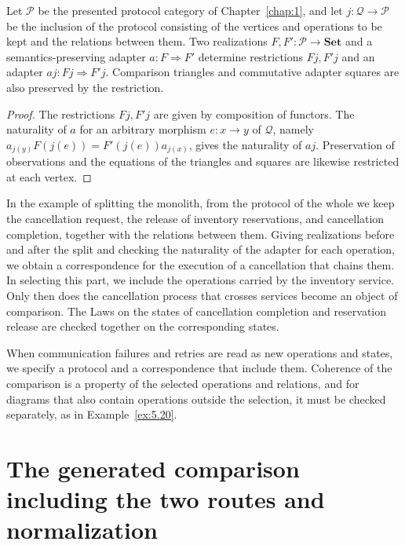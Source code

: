 \begin{proposition}\label{prop:5.36}

Let $\mathcal{P}$ be the presented protocol category of Chapter~\ref{chap:1}, and let
$j:\mathcal{Q}\to\mathcal{P}$ be the inclusion of the protocol consisting of the vertices
and operations to be kept and the relations between them. Two realizations
$F,F':\mathcal{P}\to{\mathbf{Set}}$ and a semantics-preserving adapter $a:F\Rightarrow F'$
determine restrictions $Fj,F'j$ and an adapter $aj:Fj\Rightarrow F'j$. Comparison triangles
and commutative adapter squares are also preserved by the restriction.

\end{proposition}

\begin{proof}

The restrictions $Fj,F'j$ are given by composition of functors. The naturality of $a$ for
an arbitrary morphism $e:x\to y$ of $\mathcal{Q}$, namely
$a_{j(y)}F(j(e))=F'(j(e))a_{j(x)}$, gives the naturality of $aj$. Preservation of
observations and the equations of the triangles and squares are likewise restricted at
each vertex.

\end{proof}

In the example of splitting the monolith, from the protocol of the whole we keep the
cancellation request, the release of inventory reservations, and cancellation completion,
together with the relations between them. Giving realizations before and after the split
and checking the naturality of the adapter for each operation, we obtain a correspondence
for the execution of a cancellation that chains them. In selecting this part, we include
the operations carried by the inventory service. Only then does the cancellation process
that crosses services become an object of comparison. The Laws on the states of
cancellation completion and reservation release are checked together on the corresponding
states.

When communication failures and retries are read as new operations and states, we specify
a protocol and a correspondence that include them. Coherence of the comparison is a
property of the selected operations and relations, and for diagrams that also contain
operations outside the selection, it must be checked separately, as in
Example~\ref{ex:5.20}.

\section{The generated comparison including the two routes and normalization}\label{sec:5.10}

